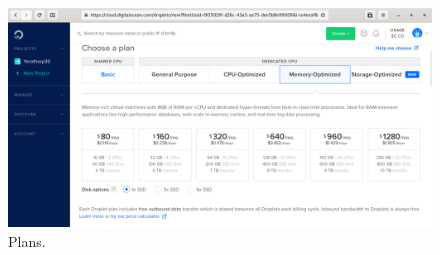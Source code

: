 \documentclass[12pt, a4paper]{article}
\begin{document}
\newpage

\begin{figure}
    \includegraphics[scale=0.57]{images/yeroth-screenshot-plan-digital-ocean.pdf}
    \caption{Plans.}
    \label{fig:plans}
\end{figure}



	
\end{document}
